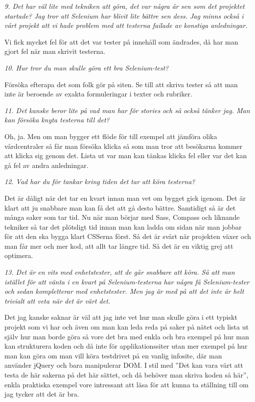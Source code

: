 \documentclass[11pt]{article}
\begin{document}
\emph{9. Det har väl lite med tekniken att göra, det var några år sen som det projektet startade? Jag tror att Selenium har blivit lite bättre sen dess. Jag minns också i vårt projekt att vi hade problem med att testerna failade av konstiga anledningar.}

Vi fick mycket fel för att det var tester på innehåll som ändrades, då har man gjort fel när man skrivit testerna.

\emph{10. Hur tror du man skulle göra ett bra Selenium-test?}

Försöka efterapa det som folk gör på siten. Se till att skriva tester så att man inte är beroende av exakta formuleringar i texter och rubriker.

\emph{11. Det kanske beror lite på vad man har för stories och så också tänker jag. Man kan försöka knyta testerna till det?}

Oh, ja. Men om man bygger ett flöde för till exempel att jämföra olika vårdcentraler så får man försöka klicka så som man tror att besökarna kommer att klicka sig genom det. Lista ut var man kan tänkas klicka fel eller var det kan gå fel av andra anledningar.

\emph{12. Vad har du för tankar kring tiden det tar att köra testerna?}

Det är dåligt när det tar en kvart innan man vet om bygget gick igenom. Det är klart att ju snabbare man kan få det att gå desto bättre. Samtidigt så är det många saker som tar tid. Nu när man börjar med Sass, Compass och liknande tekniker så tar det plötsligt tid innan man kan ladda om sidan när man jobbar för att den ska bygga klart CSSerna först. Så det är svårt när projekten växer och man får mer och mer kod, att allt tar längre tid. Så det är en viktig grej att optimera.

\emph{13. Det är en vits med enhetstester, att de går snabbare att köra. Så att man istället för att vänta i en kvart på Selenium-testerna har några få Selenium-tester och sedan kompletterar med enhetstester. Men jag är med på att det inte är helt trivialt att veta när det är värt det.}

Det jag kanske saknar är väl att jag inte vet hur man skulle göra i ett typiskt projekt som vi har och även om man kan leda reda på saker på nätet och lista ut själv hur man borde göra så vore det bra med enkla och bra exempel på hur man kan strukturera koden och då inte för applikationssiter utan mer exempel på hur man kan göra om man vill köra testdrivet på en vanlig infosite, där man använder jQuery och bara manipulerar DOM. I stil med ”Det kan vara värt att testa de här sakerna på det här sättet, och då behöver man skriva koden så här”, enkla praktiska exempel vore intressant att läsa för att kunna ta ställning till om jag tycker att det är bra.
\end{document}
